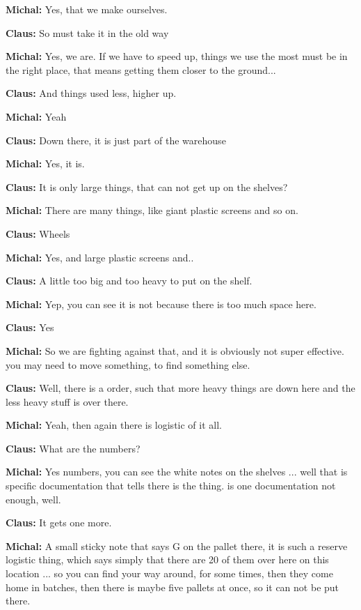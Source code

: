 \textbf{Michal:} Yes, that we make ourselves. \nl

\textbf{Claus:} So must take it in the old way \nl

\textbf{Michal:} Yes, we are. If we have to speed up, things we use the most
must be in the right place, that means getting them closer to the ground...\nl

\textbf{Claus:} And things used less, higher up.\nl

\textbf{Michal:} Yeah \nl

\textbf{Claus:} Down there, it is just part of the warehouse\nl

\textbf{Michal:} Yes, it is. \nl

\textbf{Claus:} It is only large things, that can not get up on the shelves?\nl

\textbf{Michal:} There are many things, like giant plastic screens and so on.\nl

\textbf{Claus:} Wheels \nl

\textbf{Michal:} Yes, and large plastic screens and..\nl

\textbf{Claus:} A little too big and too heavy to put on the shelf.\nl

\textbf{Michal:} Yep, you can see it is not because there is too much space
here.
\nl

\textbf{Claus:} Yes \nl

\textbf{Michal:} So we are fighting against that, and it is obviously
not super effective. you may need to move something, to find something else.\nl

\textbf{Claus:} Well, there is a order, such that more heavy things are down
here and the less heavy stuff is over there.\nl

\textbf{Michal:} Yeah, then again there is logistic of it all. \nl

\textbf{Claus:} What are the numbers? \nl

\textbf{Michal:} Yes numbers, you can see the white notes on the shelves ...
well that is specific documentation that tells there is the thing. is one
documentation not enough, well. \nl

\textbf{Claus:} It gets one more. \nl

\textbf{Michal:} A small sticky note that says G on the pallet there, it is such
a reserve logistic thing, which says simply that there are 20 of them over here
on this location ... so you can find your way around, for some times, then they
come home in batches, then there is maybe five pallets at once, so it can not be
put there. \nl

